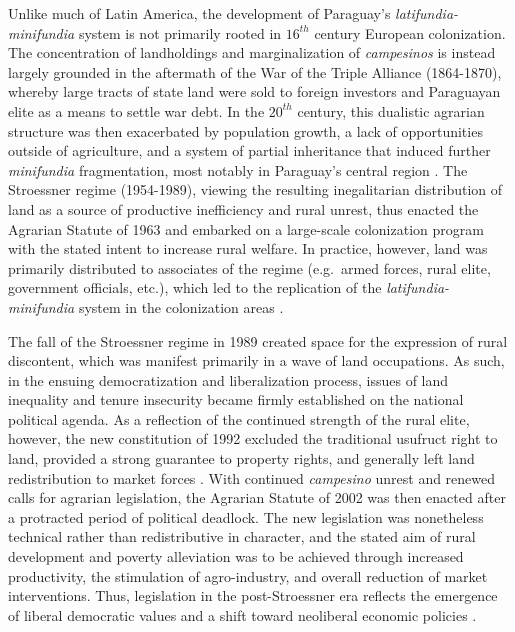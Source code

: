 \documentclass[english]{article}
\begin{document}
Unlike much of Latin America, the development of Paraguay's 
\emph{latifundia-minifundia} system is not primarily rooted in $16^{th}$ 
century European colonization.
The concentration of landholdings and marginalization of 
\emph{campesinos} is instead largely grounded in the aftermath of the War 
of the Triple Alliance (1864-1870), whereby large tracts of state land were sold 
to foreign investors and Paraguayan elite as a means to settle war debt.
In the $20^{th}$ century, this dualistic agrarian structure was then exacerbated 
by population growth, a lack of opportunities outside of
agriculture, and a system of partial inheritance that induced further 
\emph{minifundia} fragmentation, most notably in Paraguay's central region
\citep{baer1984, danielsen2009}.
The Stroessner regime (1954-1989), viewing the resulting inegalitarian 
distribution of land as a source of productive inefficiency and rural unrest, 
thus enacted the Agrarian Statute of 1963 and embarked on a large-scale 
colonization program with the stated intent to increase rural welfare.
In practice, however, land was primarily distributed to associates of the 
regime (e.g.\ armed forces, rural elite, government officials, etc.), which led to 
the replication of the \emph{latifundia-minifundia} system in the 
colonization areas \citep{weisskoff1992, nagel1999}.

The fall of the Stroessner regime in 1989 created space for the expression of 
rural discontent, which was manifest primarily in a wave of land occupations.
As such, in the ensuing democratization and liberalization process, issues of  
land inequality and tenure insecurity became firmly established on the national 
political agenda.
As a reflection of the continued strength of the rural elite, however, the new 
constitution of 1992 excluded the traditional usufruct right to land, provided a 
strong guarantee to property rights, and generally left land redistribution to 
market forces \citep{nagel1999, danielsen2009}.
With continued \emph{campesino} unrest and renewed calls for agrarian 
legislation, the Agrarian Statute of 2002 was then enacted after a protracted 
period of political deadlock.
The new legislation was nonetheless technical rather than redistributive in 
character, and the stated aim of rural development and poverty alleviation 
was to be achieved through increased productivity, the stimulation of
agro-industry, and overall reduction of market interventions.
Thus, legislation in the post-Stroessner era reflects the emergence of liberal 
democratic values and a shift toward neoliberal economic policies
\citep{danielsen2009}. 
\end{document}
